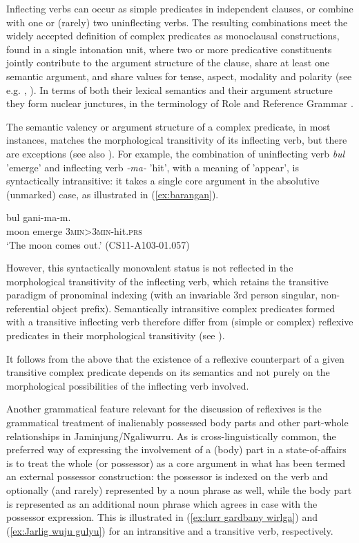 \documentclass[output=paper,colorlinks,citecolor=brown]{langscibook}
\begin{document}
Inflecting verbs can occur as simple predicates in independent clauses, or combine with one or (rarely) two uninflecting verbs. The resulting combinations meet the widely accepted definition of complex predicates as monoclausal constructions, found in a single intonation unit, where two or more predicative constituents jointly contribute to the argument structure of the clause, share at least one semantic argument, and share values for tense, aspect, modality and polarity (see e.g. \citealt[108]{Butt1997}, \citealt{Butt2010}). In terms of both their lexical semantics and their argument structure they form nuclear junctures, in the terminology of Role and Reference Grammar \citep{FoleyOlson1985}.

The semantic valency or argument structure of a complex predicate, in most instances, matches the morphological transitivity of its inflecting verb, but there are exceptions (see also \citealt[1126-1128]{SchultzeBerndt2015}). For example, the combination of uninflecting verb \textit{bul} 'emerge' and inflecting verb \textit{-ma-} 'hit', with a meaning of 'appear', is syntactically intransitive: it takes a single core argument in the absolutive (unmarked) case, as illustrated in (\ref{ex:barangan}).

\ea
{} {bul} {gani-ma-m.}\\
moon emerge \textsc{3min>3min}-hit.\textsc{prs}\\ 
\glt `The moon comes out.' (CS11-A103-01.057)
\label{ex:barangan}
\z

However, this syntactically monovalent status is not reflected in the morphological transitivity of the inflecting verb, which retains the transitive paradigm of pronominal indexing (with an invariable 3rd person singular, non-referential object prefix). Semantically intransitive complex predicates formed with a transitive inflecting verb therefore differ from (simple or complex) reflexive predicates in their morphological transitivity (see ).

It follows from the above that the existence of a reflexive counterpart of a given transitive complex predicate depends on its semantics and not purely on the morphological possibilities of the inflecting verb involved.

Another grammatical feature relevant for the discussion of reflexives is the grammatical treatment of inalienably possessed body parts and other part-whole relationships in Jaminjung/Ngaliwurru. As is cross-linguistically common, the preferred way of expressing the involvement of a (body) part in a state-of-affairs is to treat the whole (or possessor) as a core argument in what has been termed an external possessor construction: the possessor is indexed on the verb and optionally (and rarely) represented by a noun phrase as well, while the body part is represented as an additional noun phrase which agrees in case with the possessor expression. This is illustrated in (\ref{ex:lurr gardbany wirlga}) and (\ref{ex:Jarlig wuju gulyu}) for an intransitive and a transitive verb, respectively. 
\end{document}
